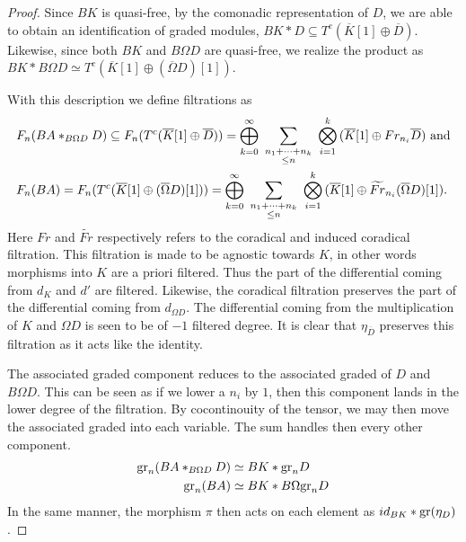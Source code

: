 \documentclass[../thesis.tex]{subfiles}
\begin{document}
\begin{proof}
                Since $BK$ is quasi-free, by the comonadic representation of $D$, we are able to obtain an identification of graded modules, $BK\ast D \subseteq T^c(\overline{K}[1]\oplus \overline{D})$. Likewise, since both $BK$ and $B\Omega D$ are quasi-free, we realize the product as $BK\ast B\Omega D \simeq T^c(\overline{K}[1]\oplus (\overline{\Omega}D)[1])$.

                With this description we define filtrations as
                \begin{align*}
                    & F_n(BA\ast_{B\Omega D}D) \subseteq F_n(T^c(\overline{K}[1]\oplus \overline{D})) = \bigoplus_{k=0}^\infty\,\,\sum_{\substack{n_1+\cdots+n_k \\ \leq n}}\,\,\bigotimes_{i = 1}^k\,(\overline{K}[1]\oplus Fr_{n_i}\overline{D})\tt{ and} \\
                    & F_n(BA) = F_n(T^c(\overline{K}[1]\oplus(\overline{\Omega}D)[1])) = \bigoplus_{k=0}^\infty\,\,\sum_{\substack{n_1+\cdots+n_k \\ \leq n}}\,\,\bigotimes_{i=1}^k\,(\overline{K}[1]\oplus\widetilde{Fr}_{n_i}(\overline{\Omega}D)[1])\tt{.}
                \end{align*}
                Here $Fr$ and $\widetilde{Fr}$ respectively refers to the coradical and induced coradical filtration. This filtration is made to be agnostic towards $K$, in other words morphisms into $K$ are a priori filtered. Thus the part of the differential coming from $d_K$ and $d'$ are filtered. Likewise, the coradical filtration preserves the part of the differential coming from $d_{\Omega D}$. The differential coming from the multiplication of $K$ and $\Omega D$ is seen to be of $-1$ filtered degree. It is clear that $\eta_{\overline{D}}$ preserves this filtration as it acts like the identity.

                The associated graded component reduces to the associated graded of $D$ and $B\Omega D$. This can be seen as if we lower a $n_i$ by $1$, then this component lands in the lower degree of the filtration. By cocontinouity of the tensor, we may then move the associated graded into each variable. The sum handles then every other component.
                \begin{align*}
                    \tt{gr}_n(BA\ast_{B\Omega D}D) & \simeq BK \ast \tt{gr}_nD \\
                    \tt{gr}_n(BA) & \simeq BK\ast B\Omega \tt{gr}_nD
                \end{align*}
                In the same manner, the morphism $\pi$ then acts on each element as $id_{BK}\ast \tt{gr}(\eta_D)$.


\end{proof}
\end{document}
